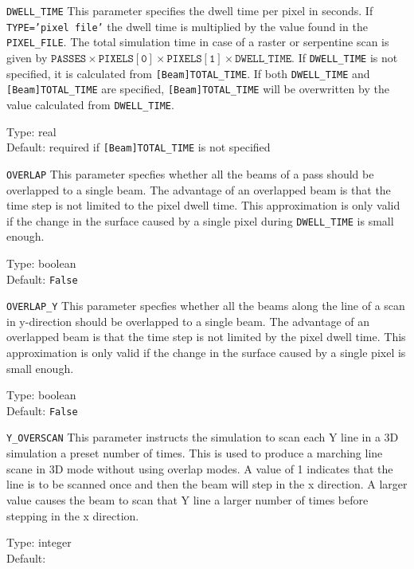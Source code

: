 \begin{keydescription}{\texttt{DWELL\_TIME}}
This parameter specifies the dwell time per pixel in seconds. If
\texttt{TYPE='pixel file'} the dwell time is multiplied by the value found in
the \texttt{PIXEL\_FILE}. The total simulation time in case of a raster or
serpentine scan is given by $\mathtt{PASSES} \times \mathtt{PIXELS[0]} \times
\mathtt{PIXELS[1]} \times \mathtt{DWELL\_TIME}$. If \texttt{DWELL\_TIME} is not
specified, it is calculated from \texttt{[Beam]TOTAL\_TIME}. If both
\texttt{DWELL\_TIME} and \texttt{[Beam]TOTAL\_TIME} are specified,
\texttt{[Beam]TOTAL\_TIME} will be overwritten by the value calculated from
\texttt{DWELL\_TIME}.
\begin{keytab}
   Type:    \> real \\
   Default: \> required if \texttt{[Beam]TOTAL\_TIME} is not specified
\end{keytab}
\end{keydescription}

\begin{keydescription}{\texttt{OVERLAP}}
This parameter specfies whether all the beams of a pass should be overlapped to
a single beam. The advantage of an overlapped beam is that the time step is not
limited to the pixel dwell time. This approximation is only valid if the change
in the surface caused by a single pixel during \texttt{DWELL\_TIME} is small
enough.
\begin{keytab}
   Type:    \> boolean \\
   Default: \> \texttt{False} 
\end{keytab}
\end{keydescription}

\begin{keydescription}{\texttt{OVERLAP\_Y}}
This parameter specfies whether all the beams along the line of a scan in
y-direction should be overlapped to a single beam. The advantage of an
overlapped beam is that the time step is not limited by the pixel dwell time.
This approximation is only valid if the change  in the surface caused by a
single pixel is small enough. 
\begin{keytab}
   Type:    \> boolean \\
   Default: \> \texttt{False} 
\end{keytab}
\end{keydescription}

\begin{keydescription}{\texttt{Y\_OVERSCAN}}
This parameter instructs the simulation to scan each Y line in a 3D 
simulation a preset number of times. This is used to produce a marching
line scane in 3D mode without using overlap modes. A value of 1 indicates
that the line is to be scanned once and then the beam will step in the x 
direction. A larger value causes the beam to scan that Y line a larger
number of times before stepping in the x direction. 
\begin{keytab}
   Type:    \> integer \\
   Default:  
\end{keytab}
\end{keydescription}

